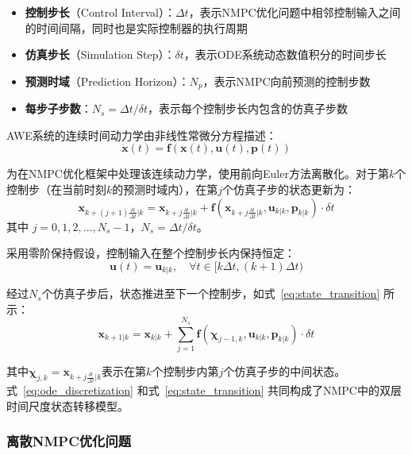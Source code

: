 \begin{itemize}
  \item \textbf{控制步长}（Control Interval）：$\Delta t$，表示NMPC优化问题中相邻控制输入之间的时间间隔，同时也是实际控制器的执行周期
  \item \textbf{仿真步长}（Simulation Step）：$\delta t$，表示ODE系统动态数值积分的时间步长
  \item \textbf{预测时域}（Prediction Horizon）：$N_p$，表示NMPC向前预测的控制步数
  \item \textbf{每步子步数}：$N_s = \Delta t / \delta t$，表示每个控制步长内包含的仿真子步数
\end{itemize}

AWE系统的连续时间动力学由非线性常微分方程描述：
\begin{equation}
  \dot{\mathbf{x}}(t) = \mathbf{f}(\mathbf{x}(t), \mathbf{u}(t), \mathbf{p}(t))
\end{equation}

为在NMPC优化框架中处理该连续动力学，使用前向Euler方法离散化。对于第$k$个控制步（在当前时刻$k$的预测时域内），在第$j$个仿真子步的状态更新为：
\begin{equation}
  \mathbf{x}_{k+(j+1)\frac{\delta t}{\Delta t}|k} = \mathbf{x}_{k+j\frac{\delta t}{\Delta t}|k} + \mathbf{f}\left(\mathbf{x}_{k+j\frac{\delta t}{\Delta t}|k}, \mathbf{u}_{k|k}, \mathbf{p}_{k|k}\right) \cdot \delta t
  \label{eq:ode_discretization}
\end{equation}
其中 $j = 0, 1, 2, \ldots, N_s-1$，$N_s = \Delta t / \delta t$。

采用零阶保持假设，控制输入在整个控制步长内保持恒定：
\begin{equation}
  \mathbf{u}(t) = \mathbf{u}_{k|k}, \quad \forall t \in [k\Delta t, (k+1)\Delta t)
\end{equation}

经过$N_s$个仿真子步后，状态推进至下一个控制步，如式~\eqref{eq:state_transition} 所示：
\begin{equation}
  \mathbf{x}_{k+1|k} = \mathbf{x}_{k|k} + \sum_{j=1}^{N_s} \mathbf{f}\left(\boldsymbol{\chi}_{j-1,k}, \mathbf{u}_{k|k}, \mathbf{p}_{k|k}\right) \cdot \delta t
  \label{eq:state_transition}
\end{equation}

其中$\boldsymbol{\chi}_{j,k} = \mathbf{x}_{k+j\frac{\delta t}{\Delta t}|k}$表示在第$k$个控制步内第$j$个仿真子步的中间状态。式~\eqref{eq:ode_discretization} 和式~\eqref{eq:state_transition} 共同构成了NMPC中的双层时间尺度状态转移模型。

\subsubsection{离散NMPC优化问题}

